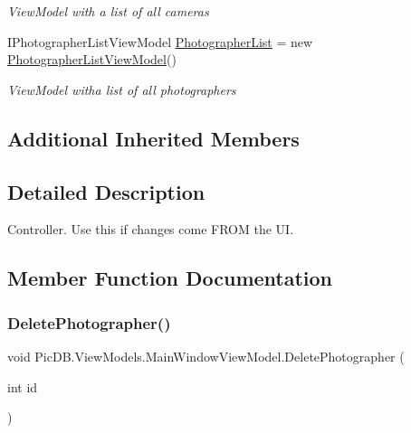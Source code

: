 \begin{DoxyCompactItemize}
\begin{DoxyCompactList}\small\item\em View\+Model with a list of all cameras \end{DoxyCompactList}\item 
I\+Photographer\+List\+View\+Model \mbox{\hyperlink{class_pic_d_b_1_1_view_models_1_1_main_window_view_model_a6cbd934dd24539156312657313f4afed}{Photographer\+List}} = new \mbox{\hyperlink{class_pic_d_b_1_1_view_models_1_1_photographer_list_view_model}{Photographer\+List\+View\+Model}}()
\begin{DoxyCompactList}\small\item\em View\+Model witha list of all photographers \end{DoxyCompactList}\end{DoxyCompactItemize}
\subsection*{Additional Inherited Members}


\subsection{Detailed Description}
Controller. Use this if changes come F\+R\+OM the UI. 



\subsection{Member Function Documentation}
\mbox{\label{class_pic_d_b_1_1_view_models_1_1_main_window_view_model_a26618fe0f1e947caf7ab7f4ca94941f2}} 
\subsubsection{\texorpdfstring{Delete\+Photographer()}{DeletePhotographer()}}
{\footnotesize\ttfamily void Pic\+D\+B.\+View\+Models.\+Main\+Window\+View\+Model.\+Delete\+Photographer (\begin{DoxyParamCaption}\item[{int}]{id }\end{DoxyParamCaption})}



